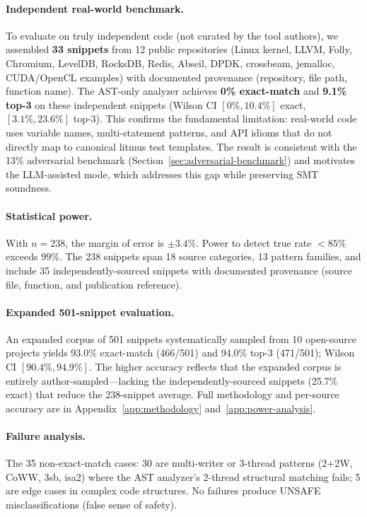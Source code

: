 \documentclass[11pt]{article}
\begin{document}
\paragraph{Independent real-world benchmark.}
To evaluate on truly independent code (not curated by the tool authors),
we assembled \textbf{33 snippets} from 12 public repositories
(Linux kernel, LLVM, Folly, Chromium, LevelDB, RocksDB, Redis,
Abseil, DPDK, crossbeam, jemalloc, CUDA/OpenCL examples) with
documented provenance (repository, file path, function name).
The AST-only analyzer achieves \textbf{0\% exact-match} and
\textbf{9.1\% top-3} on these independent snippets (Wilson CI
$[0\%, 10.4\%]$ exact, $[3.1\%, 23.6\%]$ top-3).
This confirms the fundamental limitation: real-world code uses
variable names, multi-statement patterns, and API idioms that
do not directly map to canonical litmus test templates.
The result is consistent with the 13\% adversarial benchmark
(Section~\ref{sec:adversarial-benchmark}) and motivates the
LLM-assisted mode, which addresses this gap while preserving
SMT soundness.

\paragraph{Statistical power.}
With $n = 238$, the margin of error is $\pm 3.4\%$.
Power to detect true rate $<85\%$ exceeds 99\%.
The 238 snippets span 18 source categories, 13 pattern families,
and include 35 independently-sourced snippets with documented
provenance (source file, function, and publication reference).

\paragraph{Expanded 501-snippet evaluation.}
An expanded corpus of 501 snippets systematically sampled from 10
open-source projects yields 93.0\% exact-match (466/501) and 94.0\%
top-3 (471/501); Wilson CI $[90.4\%, 94.9\%]$.
The higher accuracy reflects that the expanded corpus is
entirely author-sampled---lacking the independently-sourced
snippets (25.7\% exact) that reduce the 238-snippet average.
Full methodology and per-source accuracy are in
Appendix~\ref{app:methodology} and~\ref{app:power-analysis}.

\paragraph{Failure analysis.}
The 35 non-exact-match cases: 30 are multi-writer or 3-thread
patterns (2+2W, CoWW, 3sb, isa2) where the AST analyzer's
2-thread structural matching fails; 5 are edge cases in
complex code structures. No failures produce UNSAFE
misclassifications (false sense of safety).
\end{document}
